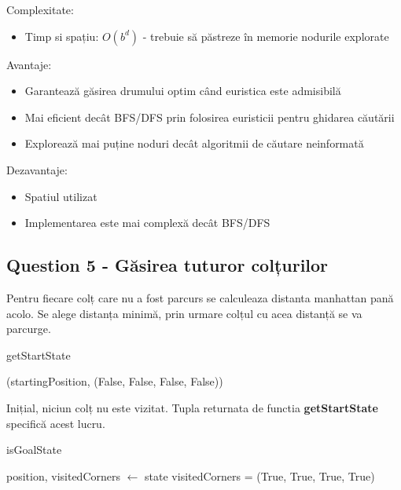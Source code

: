 \par Complexitate:
\begin {itemize}
	\item Timp si spațiu: $O(b^d)$ - trebuie să păstreze în memorie nodurile explorate
\end {itemize}

\par Avantaje:
\begin {itemize}
	\item Garantează găsirea drumului optim când euristica este admisibilă
	\item Mai eficient decât BFS/DFS prin folosirea euristicii pentru ghidarea căutării
	\item Explorează mai puține noduri decât algoritmii de căutare neinformată
\end {itemize}

\par Dezavantaje:
\begin {itemize}
	\item Spatiul utilizat
	\item Implementarea este mai complexă decât BFS/DFS
\end {itemize}

\pagebreak
\subsection {Question 5 - Găsirea tuturor colțurilor}
\par Pentru fiecare colț care nu a fost parcurs se calculeaza distanta manhattan pană acolo. Se alege distanța minimă, prin urmare colțul cu acea distanță se va parcurge.

\begin{algorithm}
\caption{getStartState}
\begin{algorithmic}[1]
    \State \Return (startingPosition, (False, False, False, False))
\EndFunction
\end{algorithmic}
\end{algorithm}

\par Inițial, niciun colț nu este vizitat. Tupla returnata de functia \textbf{getStartState} specifică acest lucru.

\begin{algorithm}
\caption{isGoalState}
\begin{algorithmic}[1]
    \State position, visitedCorners $\gets$ state
    \State \Return visitedCorners = (True, True, True, True)
\EndFunction
\end{algorithmic}
\end{algorithm}

